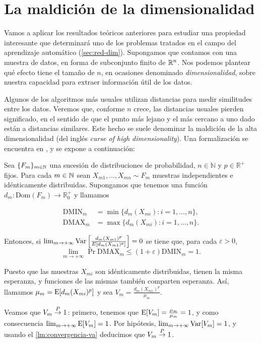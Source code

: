 \section{La maldición de la
dimensionalidad}\label{sec:dim-curse}

Vamos a aplicar los resultados teóricos anteriores para estudiar una propiedad interesante que determinará uno de los problemas tratados en el campo del aprendizaje automático (\autoref{sec:red-dim}). Supongamos que contamos con una muestra de datos, en forma de subconjunto finito de $\mathbb{R}^{n}$. Nos podemos plantear qué efecto tiene el tamaño de $n$, en ocasiones denominado \emph{dimensionalidad}, sobre nuestra capacidad para extraer información útil de los datos. 

Algunos de los algoritmos más usuales utilizan distancias para medir similitudes entre los datos. Veremos que, conforme $n$ crece, las distancias usuales pierden significado, en el
sentido de que el punto más lejano y el más cercano a uno dado están a
distancias similares. Este hecho se suele denominar la maldición de la
alta dimensionalidad (del inglés \emph{curse of high dimensionality}). Una
formalización se encuentra en \textcite{beyer1999}, y se expone a
continuación:

\theob
\label{th:dim-curse}
Sea \(\{F_{m}\}_{m\in\mathbb{N}}\) una sucesión de distribuciones de
probabilidad, \(n\in \mathbb N\) y \(p\in\mathbb R^+\) fijos. Para cada
\(m\in\mathbb{N}\) sean \(X_{m1},\dots,X_{mn}\sim F_m\) muestras independientes
e idénticamente distribuidas. Supongamos que tenemos una función
\(d_m:\mathrm{Dom}(F_m)\rightarrow \mathbb R^+_0\) y llamamos

\begin{align*}
  \mathrm{DMIN}_{m}&=\min\{d_m(X_{mi}):i=1,\dots,n\},\\
  \mathrm{DMAX}_{m}&=\max\{d_m(X_{mi}):i=1,\dots,n\}.
\end{align*}

Entonces, si
\(\lim_{m\rightarrow +\infty}\mathrm{Var}\left[\frac{d_m(X_{m1})^p}{E[d_m(X_{m1})^p]}\right]=0\)
se tiene que, para cada \(\varepsilon > 0\),
\[\lim_{m\rightarrow +\infty}\Pr{\mathrm{DMAX}_m\leq (1+\varepsilon) \mathrm{DMIN}_m}=1.\]
\proofb

Puesto que las muestras \(X_{mi}\) son idénticamente distribuidas,
tienen la misma esperanza, y funciones de las mismas también comparten
esperanza. Así, llamamos \(\mu_m = \mathrm{E}[d_m(X_{mi})^p]\) y sea
\(V_m =\frac{d_m(X_{m1})^p}{\mu_m}\).

Veamos que \(V_m\overset{P}{\rightarrow} 1\): primero, tenemos que
\(\mathrm{E}[V_m] = \frac{\mu_m}{\mu_m} = 1\), y como consecuencia
\(\lim_{m\rightarrow +\infty}\mathrm{E}[V_m] = 1\). Por hipótesis,
\(\lim_{m\rightarrow +\infty}\mathrm{Var}[V_m] = 1\), y usando el
\autoref{lm:convergencia-va} deducimos que \(V_m\overset{P}{\rightarrow} 1\).


